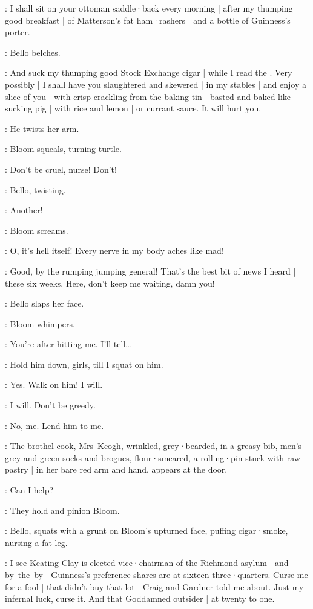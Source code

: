 \Bello:
I shall sit on your ottoman saddle·back every morning |
after my thumping good breakfast |
of Matterson's fat ham·rashers |
and a bottle of Guinness's porter.

:
Bello belches.

\Bello:
And suck my thumping good Stock Exchange cigar |
while I read the .
Very possibly |
I shall have you slaughtered and skewered |
in my stables |
and enjoy a slice of you |
with crisp crackling from the baking tin |
%
basted and baked like sucking pig |
with rice and lemon |
or currant sauce.
It will hurt you.

:
He twists her arm.

:
Bloom squeals,
turning turtle.

\Bloom:
Don't be cruel,
nurse!
Don't!

:
Bello,
twisting.

\Bello:
Another!

:
Bloom screams.

\Bloom:
O,
it's hell itself!
Every nerve in my body aches like mad!

\Bello:
Good,
by the rumping jumping general!
%
That's the best bit of news I heard |
these six weeks.
Here,
don't keep me waiting,
damn you!

:
Bello slaps her face.

:
Bloom whimpers.

\Bloom:
You're after hitting me.
I'll tell…

\Bello:
Hold him down,
girls,
till I squat on him.

\Zoe:
Yes.
Walk on him!
I will.

\Florry:
I will.
Don't be greedy.

\Kitty:
No,
me.
Lend him to me.

:
The brothel cook,
Mrs~Keogh,
wrinkled,
grey·bearded,
in a greasy bib,
men's grey and green socks and brogues,
flour·smeared,
a rolling·pin stuck with raw pastry |
in her bare red arm and hand,
appears at the door.

\MrsKeogh:
Can I help?

:
They hold and pinion Bloom.

:
Bello,
squats with a grunt on Bloom's upturned face,
%
puffing cigar·smoke,
nursing a fat leg.

\Bello:
I see Keating Clay is elected vice·chairman of the Richmond asylum |
and by~the~by |
Guinness's preference shares are at sixteen three·quarters.
Curse me for a fool |
that didn't buy that lot |
Craig and Gardner told me about.
Just my infernal luck,
curse it.
And that Goddamned outsider  |
at twenty to one.

